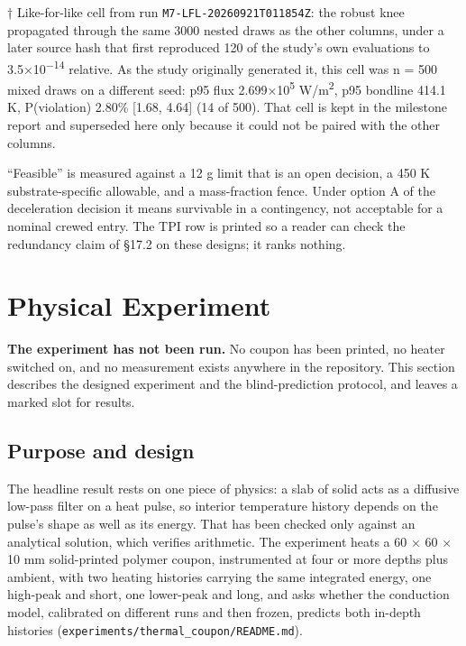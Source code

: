 \documentclass[
  a4paper,
  11pt]{article}
\begin{document}
† Like-for-like cell from run
\texttt{M7-\allowbreak{}LFL-\allowbreak{}20260921T011854Z}: the robust
knee propagated through the same 3000 nested draws as the other columns,
under a later source hash that first reproduced 120 of the study's own
evaluations to 3.5×10\textsuperscript{−14} relative. As the study
originally generated it, this cell was n = 500 mixed draws on a
different seed: p95 flux 2.699×10\textsuperscript{5}
W/m\textsuperscript{2}, p95 bondline 414.1 K, P(violation) 2.80\%
{[}1.68, 4.64{]} (14 of 500). That cell is kept in the milestone report
and superseded here only because it could not be paired with the other
columns.

``Feasible'' is measured against a 12 g limit that is an open decision,
a 450 K substrate-specific allowable, and a mass-fraction fence. Under
option A of the deceleration decision it means survivable in a
contingency, not acceptable for a nominal crewed entry. The TPI row is
printed so a reader can check the redundancy claim of §17.2 on these
designs; it ranks nothing.

\section{Physical Experiment}

\textbf{The experiment has not been run.} No coupon has been printed, no
heater switched on, and no measurement exists anywhere in the
repository. This section describes the designed experiment and the
blind-prediction protocol, and leaves a marked slot for results.

\subsection{Purpose and design}

The headline result rests on one piece of physics: a slab of solid acts
as a diffusive low-pass filter on a heat pulse, so interior temperature
history depends on the pulse's shape as well as its energy. That has
been checked only against an analytical solution, which verifies
arithmetic. The experiment heats a 60 × 60 × 10 mm solid-printed polymer
coupon, instrumented at four or more depths plus ambient, with two
heating histories carrying the same integrated energy, one high-peak and
short, one lower-peak and long, and asks whether the conduction model,
calibrated on different runs and then frozen, predicts both in-depth
histories
(\texttt{experiments/\allowbreak{}thermal\_\allowbreak{}coupon/\allowbreak{}README.md}).
\end{document}
